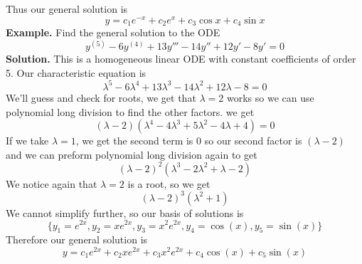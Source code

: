 \documentclass[openany]{report}
\begin{document}
    Thus our general solution is 
    \[y = c_1e^{-x} + c_2e^{x} +c_3\cos x + c_4\sin x\]
    \textbf{Example.} Find the general solution to the ODE 
    \[y^{(5)} - 6y^{(4)} + 13y''' - 14y'' + 12y' - 8y' = 0\]
    \textbf{Solution.} This is a homogeneous linear ODE with constant coefficients of order 5. Our characteristic equation is
    \[\lambda^5 - 6\lambda^4 + 13\lambda^3 - 14 \lambda^2 + 12\lambda - 8 = 0\]
    We'll guess and check for roots, we get that $\lambda = 2$ works so we can use polynomial long division to find the other factors. we get 
    \[(\lambda - 2)(\lambda^4 - 4\lambda^3 + 5\lambda^2 - 4\lambda +4) = 0\]
    If we take $\lambda = 1$, we get the second term is 0 so our second factor is $(\lambda - 2)$ and we can preform polynomial long division again to get
    \[(\lambda - 2)^2(\lambda^3-2\lambda^2 + \lambda -2)\]
    We notice again that $\lambda = 2$ is a root, so we get 
    \[(\lambda-2)^3(\lambda^2 + 1)\]
    We cannot simplify further, so our basis of solutions is 
    \[\{y_1 = e^{2x}, y_2 = xe^{2x}, y_3 = x^2e^{2x}, y_4 = \cos (x), y_5 = \sin (x)\}\]
    Therefore our general solution is 
    \[y = c_1e^{2x}+ c_2 xe^{2x}+c_3x^2e^{2x}+ c_4\cos (x) + c_5\sin (x)\]
\end{document}
